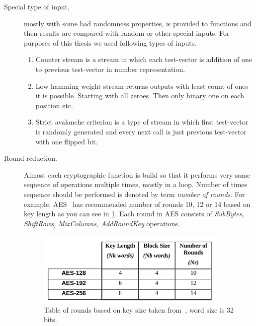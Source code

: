 \documentclass[
    digital,    %
    oneside,    %
    color,
    11pt,
    nocover,
    notable,
    nolof,
    nolot,
    final
]{fithesis3}
\begin{document}
\begin{description}
	\item[Special type of input,] mostly with some bad randomness properties, is provided to functions and then results are compared with random or other special inputs. For purposes of this thesis we used following types of inputs.
	\begin{enumerate}
		\item Counter stream is a stream in which each test-vector is addition of one to previous test-vector in number representation.
		\item Low hamming weight stream returns outputs with least count of ones it is possible. Starting with all zeroes. Then only binary one on each position etc.
		\item Strict avalanche criterion is a type of stream in which first test-vector is randomly generated and every next call is just previous test-vector with one flipped bit.
	\end{enumerate}


	\item[Round reduction.] Almost each cryptographic function is build so that it performs very same sequence of operations multiple times, mostly in a loop. Number of times sequence should be performed is denoted by term \textit{number of rounds}. For example, AES~\cite{FIPS-197} has recommended number of rounds 10, 12 or 14 based on key length as you can see in \cref{fig:fips197-rounds}. Each round in AES consists of \textit{SubBytes, ShiftRows, MixColumns, AddRoundKey} operations.
	
	\begin{figure}[h]
		\centering
		\includegraphics[width=0.9\textwidth]{./images/pictures/FIPS197-Nr-table.png}
		\caption{Table of rounds based on key size taken from~\cite{FIPS-197}, word size is 32 bits.}
		\label{fig:fips197-rounds}
	\end{figure}


\end{description}
\end{document}
